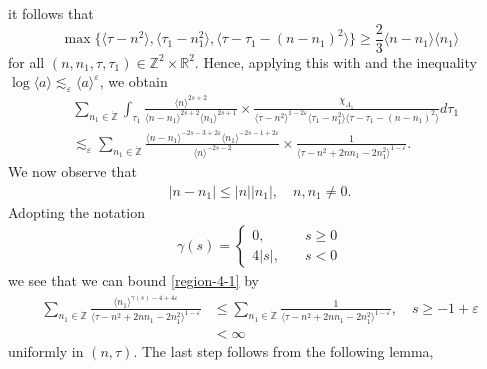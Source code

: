 \documentclass[12pt,reqno]{amsart}
\numberwithin{equation}{section}  %
\renewcommand{\cref}{\Cref}
\newcommand{\rr}{\mathbb{R}}
\newcommand{\zz}{\mathbb{Z}}
\newcommand{\zzdot}{\dot{\zz}}
\newcommand{\ee}{\varepsilon}
\begin{document}
it follows that 
\[
\max\{\langle \tau - n^{2} \rangle , \langle \tau_{1} - n_{1}^{2} \rangle, \langle \tau - \tau_{1} - (n - n_{1})^{2} \rangle    \} \ge \frac{2}{3} \langle n - n_{1} \rangle \langle n_{1} \rangle 
\]
for all $(n, n_{1}, \tau, \tau_{1}) \in \zz^{2} \times \rr^{2}$.
Hence, applying this with \cref{lem:calc} and the inequality
$\log \langle a \rangle  \lesssim_{\ee} \langle a \rangle ^{\ee}$,
we obtain
\begin{equation}
\label{region-4-1}
\begin{split}
& \sum_{n_{1} \in \zzdot} \int_{\tau_{1}} \frac{\langle n \rangle ^{2s+2}}{\langle n - n_{1}\rangle ^{2s+2} \langle n_{1} \rangle^{2s+1}}  \times \frac{\chi_{A_{1}}}{\langle \tau - n^{2} \rangle^{1- 2 \ee} \langle
\tau_{1} - n_{1}^{2} \rangle  \langle \tau - \tau_{1} - (n - n_{1})^{2} \rangle} d \tau_{1}
\\
&  \lesssim_{\ee} \sum_{n_{1} \in \zzdot} \frac{\langle n - n_{1} \rangle ^{-2s-3 + 2 \ee} \langle n_{1} \rangle ^{-2s -1 + 2\ee}}{\langle
n\rangle ^{-2s -2}} \times \frac{1}{\langle
\tau - n^{2} + 2nn_{1} -2n_{1}^{2} \rangle^{1 - \ee}}.
\end{split}
\end{equation}
We now observe that
\begin{equation}
\label{djk}
\begin{split}
| n - n_{1} | \le | n | | n_{1}|, \quad n, n_{1} \neq 0.
\end{split}
\end{equation}
Adopting the notation
\begin{equation*}
\begin{split}
\gamma(s) = 
\begin{cases} 0, \quad & s \ge 0
\\
4|s|, \quad & s < 0
\end{cases}
\end{split}
\end{equation*}
we see that we can bound \eqref{region-4-1} by
\begin{equation*}
\begin{split}
\sum_{n_{1} \in \zzdot} \frac{\langle n_{1}\rangle ^{\gamma(s)-4 + 4\ee}}{\langle \tau - n^{2} + 2nn_{1} - 2n_{1}^{2} \rangle^{1- \ee}} 
& \le  \sum_{n_{1} \in \zzdot} \frac{1}{\langle \tau - n^{2} + 2nn_{1} - 2n_{1}^{2} \rangle^{1- \ee}}, \quad s \ge -1 + \ee 
\\
&
< \infty
\end{split}
\end{equation*}
uniformly in $(n, \tau)$. The last step follows from the following lemma,
\end{document}
